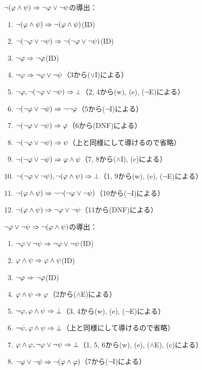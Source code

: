 \(\lnot \paren{\varphi \land \psi} \sequent \lnot \varphi \lor \lnot \psi\)の導出：
\begin{enumerate}
	\item \(\lnot \paren{\varphi \land \psi} \sequent \lnot \paren{\varphi \land \psi}\)\quad (ID)
	\item \(\lnot \paren{\lnot \varphi \lor \lnot \psi} \sequent \lnot \paren{\lnot \varphi \lor \lnot \psi}\)\quad (ID)
	\item \(\lnot \varphi \Rightarrow \lnot \varphi\)\quad (ID)
	\item \(\lnot \varphi \Rightarrow \lnot \varphi \lor \lnot \psi\)\quad （3から(\(\lor\)I)による）
	\item \(\lnot \varphi, \lnot \paren{\lnot \varphi \lor \lnot \psi} \sequent \bot\)\quad （2, 4から(w), (e), (\(\lnot\)E)による）
	\item \(\lnot \paren{\lnot \varphi \lor \lnot \psi} \sequent \lnot \lnot \varphi\)\quad （5から(\(\lnot\)I)による）
	\item \(\lnot \paren{\lnot \varphi \lor \lnot \psi} \sequent \varphi\)\quad （6から(DNF)による）
	\item \(\lnot \paren{\lnot \varphi \lor \lnot \psi} \sequent \psi\)\quad （上と同様にして導けるので省略）
	\item \(\lnot \paren{\lnot \varphi \lor \lnot \psi} \sequent \varphi \land \psi\)\quad （7, 8から(\(\land\)I), (c)による）
	\item \(\lnot \paren{\lnot \varphi \lor \lnot \psi}, \lnot \paren{\varphi \land \psi} \sequent \bot\)\quad （1, 9から(w), (e), (\(\lnot\)E)による）
	\item \(\lnot \paren{\varphi \land \psi} \sequent \lnot \lnot \paren{\lnot \varphi \lor \lnot \psi}\)\quad （10から(\(\lnot\)I)による）
	\item \(\lnot \paren{\varphi \land \psi} \sequent \lnot \varphi \lor \lnot \psi\)\quad （11から(DNF)による）
\end{enumerate}

\(\lnot \varphi \lor \lnot \psi \sequent \lnot \paren{\varphi \land \psi}\)の導出：
\begin{enumerate}
	\item \(\lnot \varphi \lor \lnot \psi \Rightarrow \lnot \varphi \lor \lnot \psi\)\quad (ID)
	\item \(\varphi \land \psi \Rightarrow \varphi \land \psi\)\quad (ID)
	\item \(\lnot \varphi \Rightarrow \lnot \varphi\)\quad (ID)
	\item \(\varphi \land \psi \Rightarrow \varphi\)\quad （2から(\(\land\)E)による）
	\item \(\lnot \varphi, \varphi \land \psi \Rightarrow \bot\)\quad （3, 4から(w), (e), (\(\lnot\)E)による）
	\item \(\lnot \psi, \varphi \land \psi \Rightarrow \bot\)\quad （上と同様にして導けるので省略）
	\item \(\varphi \land \varphi, \lnot \varphi \lor \lnot \psi \Rightarrow \bot\)\quad （1, 5, 6から(w), (e), (\(\land\)E), (c)による）
	\item \(\lnot \varphi \lor \lnot \psi \sequent \lnot \paren{\varphi \land \varphi}\)\quad （7から(\(\lnot\)I)による）
\end{enumerate}

